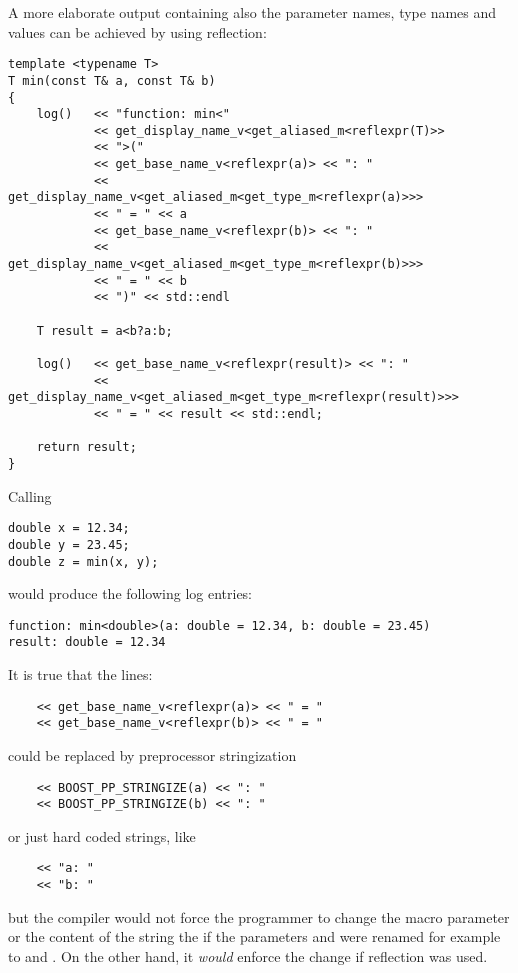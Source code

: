 A more elaborate output containing also the parameter names, type names and values
can be achieved by using reflection:

\begin{verbatim}
template <typename T>
T min(const T& a, const T& b)
{
	log()   << "function: min<"
	        << get_display_name_v<get_aliased_m<reflexpr(T)>>
	        << ">("
	        << get_base_name_v<reflexpr(a)> << ": "
	        << get_display_name_v<get_aliased_m<get_type_m<reflexpr(a)>>>
	        << " = " << a
	        << get_base_name_v<reflexpr(b)> << ": "
	        << get_display_name_v<get_aliased_m<get_type_m<reflexpr(b)>>>
	        << " = " << b
	        << ")" << std::endl

	T result = a<b?a:b;

	log()   << get_base_name_v<reflexpr(result)> << ": "
	        << get_display_name_v<get_aliased_m<get_type_m<reflexpr(result)>>>
	        << " = " << result << std::endl;

	return result;
}
\end{verbatim}

Calling

\begin{verbatim}
double x = 12.34;
double y = 23.45;
double z = min(x, y);
\end{verbatim}

would produce the following log entries:

\begin{verbatim}
function: min<double>(a: double = 12.34, b: double = 23.45)
result: double = 12.34
\end{verbatim}


It is true that the lines:
\begin{verbatim}
	<< get_base_name_v<reflexpr(a)> << " = "
	<< get_base_name_v<reflexpr(b)> << " = "
\end{verbatim}

could be replaced by preprocessor stringization

\begin{verbatim}
	<< BOOST_PP_STRINGIZE(a) << ": "
	<< BOOST_PP_STRINGIZE(b) << ": "
\end{verbatim}

or just hard coded strings, like

\begin{verbatim}
	<< "a: "
	<< "b: "
\end{verbatim}

but the compiler would not force the programmer to change the macro parameter
or the content of the string the if the parameters \verb@a@ and \verb@b@ were renamed
for example to \verb@first@ and \verb@second@. On the other hand, it {\em would}
enforce the change if reflection was used.


